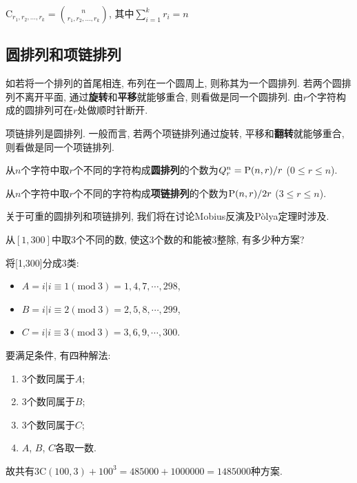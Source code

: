         \begin{theorem}\rm
            $\mathrm{C}_{r_1,r_2,\ldots,r_k}={n\choose r_1,r_2,\ldots,r_k}$, 其中$\sum_{i=1}^kr_i=n$
        \end{theorem}

    \subsection{圆排列和项链排列}

        \begin{definition}[圆排列]
            如若将一个排列的首尾相连, 布列在一个圆周上, 则称其为一个\textsf{圆排列}. 若两个圆排列不离开平面, 通过\textbf{旋转}和\textbf{平移}就能够重合, 则看做是同一个圆排列. 由$r$个字符构成的圆排列可在$r$处做顺时针断开.
        \end{definition}

        \begin{definition}[项链排列]
            \textsf{项链排列}是圆排列. 一般而言, 若两个项链排列通过旋转, 平移和\textbf{翻转}就能够重合, 则看做是同一个项链排列. 
        \end{definition}

        \begin{theorem}\rm
            从$n$个字符中取$r$个不同的字符构成\textbf{圆排列}的个数为$Q^n_r=\P(n,r)/r$ ($0\leqslant r\leqslant n$).

            从$n$个字符中取$r$个不同的字符构成\textbf{项链排列}的个数为$\P(n,r)/2r$ ($3\leqslant r\leqslant n$).
        \end{theorem}

        关于可重的圆排列和项链排列, 我们将在讨论Mobius反演及P\`olya定理时涉及.

        \begin{example}
            从$[1,300]$中取3个不同的数, 使这3个数的和能被3整除, 有多少种方案? 

            \begin{sol}
                将[1,300]分成3类: 
                \begin{itemize}
                    \item $A={i|i\equiv1(\mathrm{mod\ }3)}={1,4,7,\cdots,298}$,
                    \item $B={i|i\equiv2(\mathrm{mod\ }3)}={2,5,8,\cdots,299}$,
                    \item $C={i|i\equiv3(\mathrm{mod\ }3)}={3,6,9,\cdots,300}$.
                \end{itemize}
                要满足条件, 有四种解法: 
                \begin{enumerate}
                    \item 3个数同属于$A$;
                    \item 3个数同属于$B$;
                    \item 3个数同属于$C$;
                    \item $A$, $B$, $C$各取一数.
                \end{enumerate}
                故共有$3\mathrm{C}(100,3)+100^3=485000+1000000=1485000$种方案.
            \end{sol}
        \end{example}

